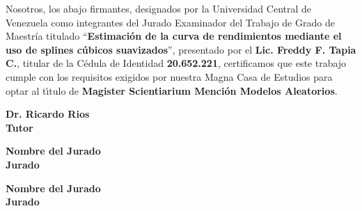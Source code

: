 

Nosotros, los abajo firmantes, designados por la Universidad Central de Venezuela como
integrantes del Jurado Examinador del Trabajo de Grado de Maestr\'ia titulado ``\textbf{Estimaci\'on de la curva de rendimientos mediante 
el uso de splines c\'ubicos suavizados}'', presentado por el \textbf{Lic. Freddy F. Tapia C.}, titular de
la C\'edula de Identidad \textbf{20.652.221}, certificamos que este trabajo cumple con los
requisitos exigidos por nuestra Magna Casa de Estudios para optar al t\'{\i}tulo de
\textbf{Magister Scientiarium Menci\'on Modelos Aleatorios}.



\vspace{2cm}

\begin{center}
\underline{\hspace{8cm}}

\vspace{1cm}

\textbf{ Dr. Ricardo Rios \\Tutor}

\vspace{3cm}

\underline{\hspace{8cm}}

\vspace{1cm}

\textbf{ Nombre del Jurado \\Jurado}

\vspace{3cm}

\underline{\hspace{8cm}}

\vspace{1cm}

\textbf{ Nombre del Jurado \\Jurado}

\end{center}

\newpage
